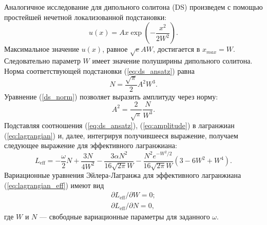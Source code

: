 Аналогичное исследование для дипольного солитона (DS) произведем с помощью простейшей нечетной локализованной подстановки:
%
\begin{equation}
u(x) = Ax \exp \left( -\dfrac{x^2}{2 W^2} \right).
\label{eq:ds_ansatz}
\end{equation}
%
Максимальное значение $u(x)$, равное $\sqrt{e}AW$, достигается в $x_{max} = W$.
Следовательно параметр $W$ имеет значение полуширины дипольного солитона.
Норма соответствующей подстановки (\ref{eq:ds_ansatz}) равна
%
\begin{equation}
N = \dfrac{\sqrt{\pi}}{2} A^2 W^3.
\label{ds_norm}
\end{equation}
%
Уравнение (\ref{ds_norm}) позволяет выразить амплитуду через норму:
%
\begin{equation}
A^2 = \dfrac{2}{\sqrt{\pi}} \dfrac{N}{W^3}.
\label{eq:amplitude}
\end{equation}
% 
Подставляя соотношения (\ref{eq:ds_ansatz}), (\ref{eq:amplitude}) в лагранжиан (\ref{eq:lagrangian}) и, далее, интегрируя получившееся выражение, получаем следующее выражение для эффективного лагранжиана:
%
\begin{equation}
L_{\mathrm{eff}}=-\frac{\omega }{2}N+\frac{3N}{4W^{2}}-\frac{3\alpha N^{2}}{16\sqrt{2\pi}W}-\frac{N^{2}e^{-W^{2}/2}}{16\sqrt{2\pi}W}\left(3-6W^{2}+W^{4}\right).
\label{eq:lagrangian_eff}
\end{equation}
%
Вариационные уравнения Эйлера-Лагранжа для эффективного лагранжиана (\ref{eq:lagrangian_eff}) имеют вид
%
\begin{eqnarray}
\partial L_{\mathrm{eff}}/\partial W = 0; \label{eq:dw} \\
\partial L_{\mathrm{eff}}/\partial N = 0, \label{eq:dn}
\end{eqnarray}
%
где $W$ и $N$ --- свободные вариационные параметры для заданного $\omega$.

